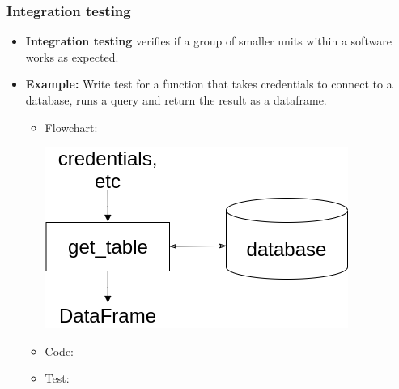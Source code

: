 \documentclass[9pt,xcolor=dvipsnames]{beamer}
\begin{document}
\begin{frame}
  \frametitle{Integration testing}
  \begin{overlayarea}{\textwidth}{\textheight}
  \begin{itemize}
    \item \textbf{Integration testing} verifies if a group of
      smaller units within a software works as expected.
    \item \textbf{Example:} Write test for a function that takes
      credentials to connect to a database, runs a query and return the
      result as a dataframe.
      \begin{itemize}
      \item<only@1> Flowchart:
        \vspace{1cm}
        \begin{center}
          \includegraphics[scale=0.4]{figs/get_table.png}
        \end{center}
      \item<only@2> Code:
          
        \item<only@3> Test:
          
      \end{itemize}
  \end{itemize}
  \end{overlayarea}
\end{frame}
\end{document}
